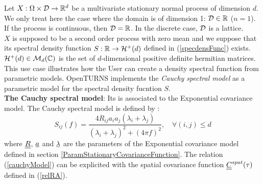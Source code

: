 \renewcommand{\filename}{docUC_StocProc_DensitySpectralFunction_Param.tex}
\renewcommand{\filetitle}{UC :  Creation of a  parametric  spectral density function}

\HeaderIIILevel

\label{DensitySpectralFunctionParam}


Let $X: \Omega \times {\mathcal D} \rightarrow {\mathbb R}^d$  be a multivariate  stationary normal process of dimension $d$. We only treat here the case where the domain is of dimension 1: ${\mathcal D} \in {\mathbb R}$ ($n=1$). \\
If the process is continuous, then ${\mathcal D}={\mathbb R}$. In the discrete case, ${\mathcal D}$  is a lattice. \\

$X$ is supposed to be a second order process with zero mean and we suppose that its spectral density function $S : {\mathbb R} \rightarrow \mathcal{H}^+(d)$ defined in (\ref{specdensFunc}) exists. $\mathcal{H}^+(d) \in \mathcal{M}_d({\mathbb C})$ is the set of $d$-dimensional positive definite hermitian matrices.\\

This use case illustrates how the User can create a density spectral function from parametric models. OpenTURNS  implements the  \emph{Cauchy spectral model}  as a parametric model for the spectral density fucntion $S$. \\

{\bf The  Cauchy spectral model}: Its is associated to the Exponential covariance model.  The Cauchy spectral model is defined by :
\begin{equation}\label{cauchyModel}
  S_{ij}(f) = \displaystyle \frac{4R_{ij}a_ia_j(\lambda_i+ \lambda_j)}{(\lambda_i+ \lambda_j)^2 + (4\pi f)^2}, \quad \forall (i,j) \leq d
\end{equation}
where ${\underline{\underline{R}}}$, ${\underline{a}}$ and ${\underline{\lambda}}$ are the parameters of the Exponential covariance model defined in section \ref{ParamStationaryCovarianceFunction}. The relation (\ref{cauchyModel}) can be explicited with the spatial covariance function  ${\underline{\underline{C}}}^{spat}(\tau)$ defined in (\ref{relRA}).\\

